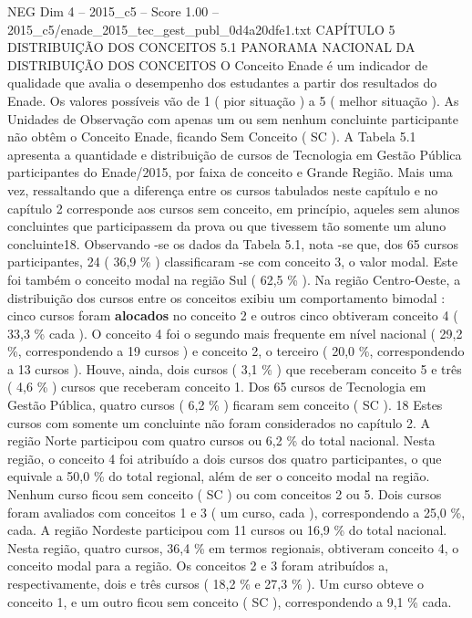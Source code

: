 \begin{textsample}{NEG Dim 4 – 2015\_c5 – Score 1.00 – 2015\_c5/enade\_2015\_tec\_gest\_publ\_0d4a20dfe1.txt}  \label{ex:f4_neg_181}
CAPÍTULO 5 DISTRIBUIÇÃO DOS CONCEITOS 5.1 PANORAMA NACIONAL DA DISTRIBUIÇÃO DOS CONCEITOS O Conceito Enade é um indicador de qualidade que avalia o desempenho dos estudantes a partir dos resultados do Enade.
Os valores possíveis vão de 1 ( pior situação ) a 5 ( melhor situação ).
As Unidades de Observação com apenas um ou sem nenhum concluinte participante não obtêm o Conceito Enade, ficando Sem Conceito ( SC ).
A Tabela 5.1 apresenta a quantidade e distribuição de cursos de Tecnologia em Gestão Pública participantes do Enade/2015, por faixa de conceito e Grande Região.
Mais uma vez, ressaltando que a diferença entre os cursos tabulados neste capítulo e no capítulo 2 corresponde aos cursos sem conceito, em princípio, aqueles sem alunos concluintes que participassem da prova ou que tivessem tão somente um aluno concluinte18.
Observando -se os dados da Tabela 5.1, nota -se que, dos 65 cursos participantes, 24 ( 36,9 \% ) classificaram -se com conceito 3, o valor modal.
Este foi também o conceito modal na região Sul ( 62,5 \% ).
Na região Centro-Oeste, a distribuição dos cursos entre os conceitos exibiu um comportamento bimodal : cinco cursos foram \textbf{alocados} no conceito 2 e outros cinco obtiveram conceito 4 ( 33,3 \% cada ).
O conceito 4 foi o segundo mais frequente em nível nacional ( 29,2 \%, correspondendo a 19 cursos ) e conceito 2, o terceiro ( 20,0 \%, correspondendo a 13 cursos ).
Houve, ainda, dois cursos ( 3,1 \% ) que receberam conceito 5 e três ( 4,6 \% ) cursos que receberam conceito 1.
Dos 65 cursos de Tecnologia em Gestão Pública, quatro cursos ( 6,2 \% ) ficaram sem conceito ( SC ). 18 Estes cursos com somente um concluinte não foram considerados no capítulo 2.
A região Norte participou com quatro cursos ou 6,2 \% do total nacional.
Nesta região, o conceito 4 foi atribuído a dois cursos dos quatro participantes, o que equivale a 50,0 \% do total regional, além de ser o conceito modal na região.
Nenhum curso ficou sem conceito ( SC ) ou com conceitos 2 ou 5.
Dois cursos foram avaliados com conceitos 1 e 3 ( um curso, cada ), correspondendo a 25,0 \%, cada.
A região Nordeste participou com 11 cursos ou 16,9 \% do total nacional.
Nesta região, quatro cursos, 36,4 \% em termos regionais, obtiveram conceito 4, o conceito modal para a região.
Os conceitos 2 e 3 foram atribuídos a, respectivamente, dois e três cursos ( 18,2 \% e 27,3 \% ).
Um curso obteve o conceito 1, e um outro ficou sem conceito ( SC ), correspondendo a 9,1 \% cada.

\end{textsample}
